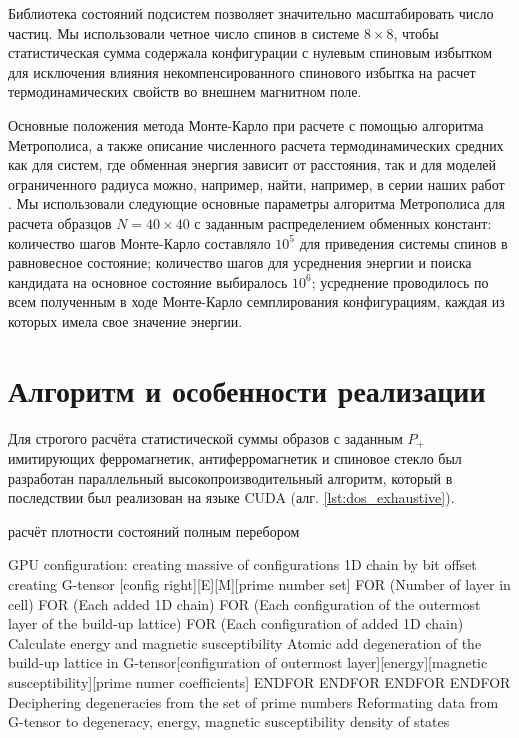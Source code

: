 Библиотека состояний подсистем позволяет значительно масштабировать число частиц. Мы использовали четное число спинов в системе $8\times8$, чтобы статистическая сумма содержала конфигурации с нулевым спиновым избытком для исключения влияния некомпенсированного спинового избытка на расчет термодинамических свойств во внешнем магнитном поле.

Основные положения метода Монте-Карло при расчете с помощью алгоритма Метрополиса, а также описание численного расчета термодинамических средних как для систем, где обменная энергия зависит от расстояния, так и для моделей ограниченного радиуса можно, например, найти, например, в серии наших работ  \cite{Shevchenko2017, makarov2019, Shevchenko2022, makarova2023}. Мы использовали следующие основные параметры алгоритма Метрополиса для расчета образцов $N=40\times40$ с заданным распределением обменных констант: количество шагов Монте-Карло составляло $10^5$ для приведения системы спинов в равновесное состояние; количество шагов для усреднения энергии и поиска кандидата на основное состояние выбиралось $10^6$; усреднение проводилось по всем полученным в ходе Монте-Карло семплирования конфигурациям, каждая из которых имела свое значение энергии.

\section{Алгоритм и особенности реализации}

Для строгого расчёта статистической суммы образов с заданным $P_+$ имитирующих ферромагнетик, антиферромагнетик и спиновое стекло был разработан параллельный высокопроизводительный алгоритм, который в последствии был реализован на языке CUDA (алг. \cref{lst:dos_exhaustive}).


\begin{ListingEnv}[!h]
	\captiondelim{ } %
	\caption{расчёт плотности состояний полным перебором}\label{lst:dos_exhaustive}
	\begin{Verb}
GPU configuration:
creating massive of configurations 1D chain by bit offset
creating G-tensor [config right][E][M][prime number set]
 FOR (Number of layer in cell)
 {
  FOR (Each added 1D chain)
  {
   FOR (Each configuration of the outermost layer of the build-up lattice)
   {
    FOR (Each configuration of added 1D chain)
     Calculate energy and magnetic susceptibility
     Atomic add degeneration of the build-up lattice in G-tensor[configuration of 
     outermost layer][energy][magnetic susceptibility][prime numer coefficients]
    ENDFOR
   }
   ENDFOR
  }
  ENDFOR
 }
 ENDFOR
Deciphering degeneracies from the set of prime numbers
Reformating data from G-tensor to degeneracy, energy, magnetic susceptibility 
density of states
	\end{Verb}
\end{ListingEnv}

